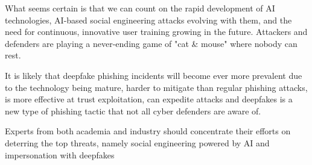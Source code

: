 What seems certain is that we can count on the rapid development of AI technologies, AI-based social engineering attacks evolving with them, and the need for continuous, innovative user training growing in the future. Attackers and defenders are playing a never-ending game of "cat \& mouse" where nobody can rest.

It is likely that deepfake phishing incidents will become ever more prevalent \citep{mirsky_Threat_Offensive_AI_Organizations_2023} due to the technology being mature, harder to mitigate than regular phishing attacks, is more effective at trust exploitation, can expedite attacks and deepfakes is a new type of phishing tactic that not all cyber defenders are aware of.

Experts from both academia and industry should concentrate their efforts on deterring the top threats, namely social engineering powered by AI and impersonation with deepfakes \citep{mirsky_Threat_Offensive_AI_Organizations_2023}